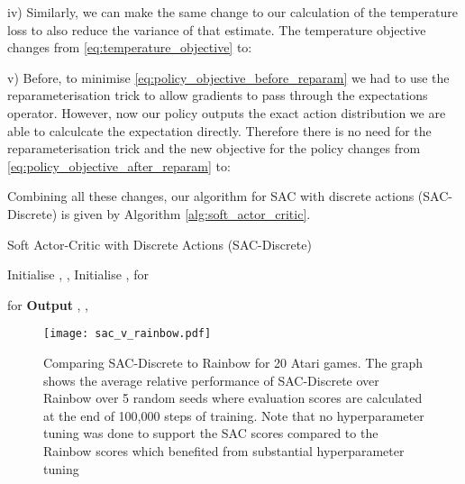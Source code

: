 \documentclass{article}
\begin{document}
iv) Similarly, we can make the same change to our calculation of the temperature loss to also reduce the variance of that estimate. The temperature objective changes from \eqref{eq:temperature_objective} to:



v) Before, to minimise  \eqref{eq:policy_objective_before_reparam} we had to use the reparameterisation trick to allow gradients to pass through the expectations operator. However, now our policy outputs the exact action distribution we are able to calculcate the expectation directly. Therefore there is no need for the reparameterisation trick and the new objective for the policy changes from \eqref{eq:policy_objective_after_reparam} to:



Combining all these changes, our algorithm for SAC with discrete actions (SAC-Discrete) is given by Algorithm \ref{alg:soft_actor_critic}.


\begin{algorithm}
\caption{Soft Actor-Critic with Discrete Actions (SAC-Discrete)}
\label{alg:soft_actor_critic}
\begin{algorithmic}
\State Initialise  , ,  
\State Initialise  
\State ,  
\State  {}
	    \State  {}
	    \State  {}
	    \State  {}
	\EndFor
\State  for  
	    
	    
	    \State {}
	    \State  {}
	    \State  for 
	\EndFor
\EndFor
  \textbf{Output} 
 , , 
\end{algorithmic}
\end{algorithm}

\begin{figure}[h]
\centering
\texttt{[image: sac\_v\_rainbow.pdf]}
\caption{\label{fig:sac_vs_rainbow} Comparing SAC-Discrete to Rainbow for 20 Atari games. The graph shows the average relative performance of SAC-Discrete over Rainbow over 5 random seeds where evaluation scores are calculated at the end of 100,000 steps of training. Note that no hyperparameter tuning was done to support the SAC scores compared to the Rainbow scores which benefited from substantial hyperparameter tuning}
\end{figure}
\end{document}
